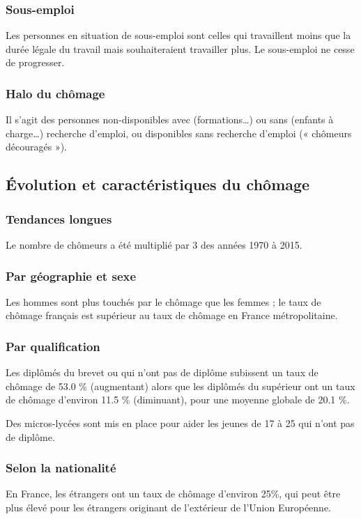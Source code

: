\documentclass[10pt,a4paper,french]{article}
\begin{document}
\subsubsection{Sous-emploi}
Les personnes en situation de sous-emploi sont celles qui travaillent moins que la durée légale du travail mais souhaiteraient travailler plus.
Le sous-emploi ne cesse de progresser.

\subsubsection{Halo du chômage}
Il s'agit des personnes non-disponibles avec (formations\ldots) ou sans (enfants à charge\ldots) recherche
d'emploi, ou disponibles sans recherche d'emploi (« chômeurs découragés »).

\subsection{Évolution et caractéristiques du chômage}

\subsubsection{Tendances longues}
Le nombre de chômeurs a été multiplié par 3 des années 1970 à 2015.

\subsubsection{Par géographie et sexe}
Les hommes sont plus touchés par le chômage que les femmes ; le taux de chômage français est supérieur au taux de chômage en France métropolitaine.

\subsubsection{Par qualification}
Les diplômés du brevet ou qui n'ont pas de diplôme subissent un taux de chômage de 53.0 \% (augmentant) alors que les diplômés du supérieur ont un taux de chômage d'environ 11.5 \% (diminuant), pour une moyenne globale de 20.1 \%.

Des micros-lycées sont mis en place pour aider les jeunes de 17 à 25 qui n’ont pas de diplôme.

\subsubsection{Selon la nationalité}
En France, les étrangers ont un taux de chômage d'environ 25\%, qui peut être plus élevé pour les étrangers originant de l'extérieur de l'Union Européenne.
\end{document}
